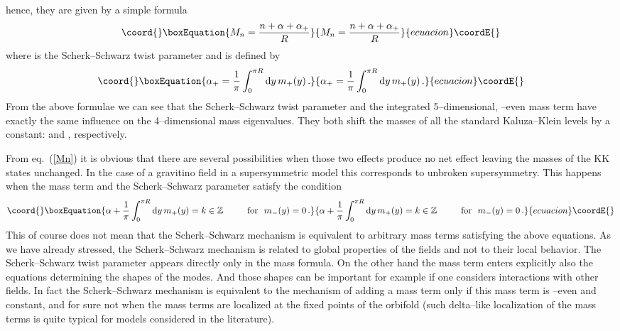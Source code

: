 \documentclass[a4paper,12pt]{article}
\def\al{\alpha}
\def\d{{\rm d}}
\def\ZZ{\mathbb Z}
\begin{document}
hence, they are given by a simple formula
\begin{equation}\coord{}\boxEquation{
M_n=\frac{n+\al+\al_+}{R}
\label{Mn}
}{
M_n=\frac{n+\al+\al_+}{R}
}{ecuacion}\coordE{}\end{equation}
where \myHighlight{$\al$}\coordHE{} is the Scherk--Schwarz twist parameter and \myHighlight{$\al_+$}\coordHE{} is
defined by
\begin{equation}\coord{}\boxEquation{
\al_+=\frac{1}{\pi}\int_0^{\pi R}\d y\,m_+(y)
\,.
\label{alphaplus}
}{
\al_+=\frac{1}{\pi}\int_0^{\pi R}\d y\,m_+(y)
\,.
}{ecuacion}\coordE{}\end{equation}
From the above formulae we can see that the Scherk--Schwarz twist
parameter \myHighlight{$\al$}\coordHE{} and the integrated 5--dimensional, \myHighlight{$\ZZ_2$}\coordHE{}--even mass
term \myHighlight{$\al_+$}\coordHE{} 
have exactly the same influence on the 4--dimensional mass
eigenvalues. They both shift the masses of all the standard
Kaluza--Klein levels by a constant: \myHighlight{$\al/R$}\coordHE{} and \myHighlight{$\al_+/R$}\coordHE{},
respectively.  


From eq.\ (\ref{Mn}) it is obvious that there are several
possibilities when those two effects produce no net effect leaving the
masses of the KK states unchanged. In the case of a 
gravitino field in a supersymmetric model this corresponds to unbroken
supersymmetry. This happens when the mass term and the
Scherk--Schwarz parameter satisfy the condition
\begin{equation}\coord{}\boxEquation{
\al+\frac{1}{\pi}\int_0^{\pi R}\d y\,m_+(y) 
=
k \in \ZZ
\qquad {\rm\ \ for\ \ }m_-(y)=0
\,.
\label{unchangedKK}
}{
\al+\frac{1}{\pi}\int_0^{\pi R}\d y\,m_+(y) 
=
k \in \ZZ
\qquad {\rm\ \ for\ \ }m_-(y)=0
\,.
}{ecuacion}\coordE{}\end{equation}
This of course does not mean that the Scherk--Schwarz mechanism
is equivalent to arbitrary mass terms satisfying the above equations. 
As we have already stressed, the Scherk--Schwarz mechanism is related
to global properties of the fields and not to their local behavior. 
The Scherk--Schwarz twist parameter appears directly only in the mass
formula. On the other hand the mass term \coordHE{} enters explicitly
also the equations determining the shapes of the modes. And those
shapes can be important for example if one considers interactions with
other fields. In fact the Scherk--Schwarz mechanism is equivalent to
the mechanism of adding a mass term only if this mass term is
\myHighlight{$\ZZ_2$}\coordHE{}--even and constant, and for sure 
not when the mass terms are localized at the fixed points of the
orbifold (such delta--like localization of the mass terms is quite
typical for models considered in the literature).  
\end{document}
